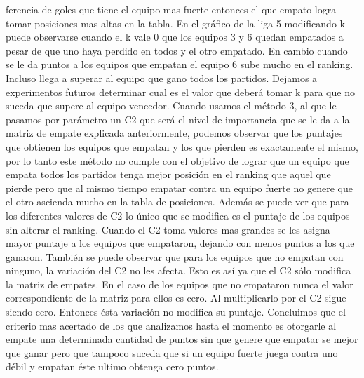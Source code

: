 ferencia de goles que tiene el equipo mas fuerte entonces el que empato logra tomar posiciones mas altas en la tabla.
            En el gráfico de la liga 5 modificando k puede observarse cuando el k vale 0 que los equipos 3 y 6 quedan empatados a pesar de que uno haya perdido en todos y el otro empatado. En cambio cuando se le da puntos a los equipos que empatan el equipo 6 sube mucho en el ranking. Incluso llega a superar al equipo que gano todos los partidos. Dejamos a experimentos futuros determinar cual es el valor que deberá tomar k para que no suceda que supere al equipo vencedor.
            Cuando usamos el método 3, al que le pasamos por parámetro un C2 que será el nivel de importancia que se le da a la matriz de empate explicada anteriormente, podemos observar que los puntajes que obtienen los equipos que empatan y los que pierden es exactamente el mismo, por lo tanto este método no cumple con el objetivo de lograr que un equipo que empata todos los partidos tenga mejor posición en el ranking que aquel que pierde pero que al mismo tiempo empatar contra un equipo fuerte no genere que el otro ascienda mucho en la tabla de posiciones. Además se puede ver que para los diferentes valores de C2 lo único que se modifica es el puntaje de los equipos sin alterar el ranking. Cuando el C2 toma valores mas grandes se les asigna mayor puntaje a los equipos que empataron, dejando con menos puntos a los que ganaron. 
            También se puede observar que para los equipos que no empatan con ninguno, la variación del C2 no les afecta. Esto es así ya que el C2 sólo modifica la matriz de empates. En el caso de los equipos que no empataron nunca el valor correspondiente de la matriz para ellos es cero. Al multiplicarlo por el C2 sigue siendo cero. Entonces ésta variación no modifica su puntaje.
            Concluimos que el criterio mas acertado de los que analizamos hasta el momento es otorgarle al empate una determinada cantidad de puntos sin que genere que empatar se mejor que ganar pero que tampoco suceda que si un equipo fuerte juega contra uno débil y empatan éste ultimo obtenga cero puntos. 

